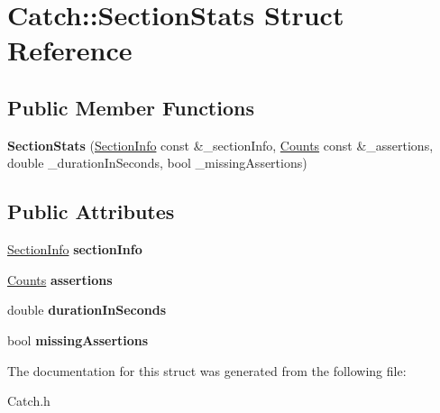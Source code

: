 \hypertarget{struct_catch_1_1_section_stats}{\section{Catch\-:\-:Section\-Stats Struct Reference}
\label{struct_catch_1_1_section_stats}
}
\subsection*{Public Member Functions}
\begin{DoxyCompactItemize}
\item 
\hypertarget{struct_catch_1_1_section_stats_abadf375cb596682e34781b606eb10bfe}{{\bfseries Section\-Stats} (\hyperlink{struct_catch_1_1_section_info}{Section\-Info} const \&\-\_\-section\-Info, \hyperlink{struct_catch_1_1_counts}{Counts} const \&\-\_\-assertions, double \-\_\-duration\-In\-Seconds, bool \-\_\-missing\-Assertions)}\label{struct_catch_1_1_section_stats_abadf375cb596682e34781b606eb10bfe}

\end{DoxyCompactItemize}
\subsection*{Public Attributes}
\begin{DoxyCompactItemize}
\item 
\hypertarget{struct_catch_1_1_section_stats_a524d0cd3b91acc6a4d0f24d6e50275bb}{\hyperlink{struct_catch_1_1_section_info}{Section\-Info} {\bfseries section\-Info}}\label{struct_catch_1_1_section_stats_a524d0cd3b91acc6a4d0f24d6e50275bb}

\item 
\hypertarget{struct_catch_1_1_section_stats_a789bbc5c115f2914286458d282430685}{\hyperlink{struct_catch_1_1_counts}{Counts} {\bfseries assertions}}\label{struct_catch_1_1_section_stats_a789bbc5c115f2914286458d282430685}

\item 
\hypertarget{struct_catch_1_1_section_stats_ae3276a60071b4221907a571b822b0a94}{double {\bfseries duration\-In\-Seconds}}\label{struct_catch_1_1_section_stats_ae3276a60071b4221907a571b822b0a94}

\item 
\hypertarget{struct_catch_1_1_section_stats_a4840f83088787653a656c98e664e6b51}{bool {\bfseries missing\-Assertions}}\label{struct_catch_1_1_section_stats_a4840f83088787653a656c98e664e6b51}

\end{DoxyCompactItemize}


The documentation for this struct was generated from the following file\-:\begin{DoxyCompactItemize}
\item 
Catch.\-h\end{DoxyCompactItemize}
